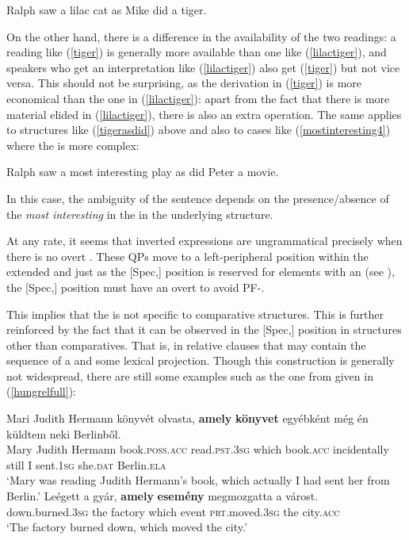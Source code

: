 \ea	Ralph saw a lilac cat as Mike did a tiger. \label{tigerasdid}
\z

On the other hand, there is a difference in the availability of the two readings: a reading like (\ref{tiger}) is generally more available than one like (\ref{lilactiger}), and speakers who get an interpretation like (\ref{lilactiger}) also get (\ref{tiger}) but not vice versa. This should not be surprising, as the derivation in (\ref{tiger}) is more economical than the one in (\ref{lilactiger}): apart from the fact that there is more material elided in (\ref{lilactiger}), there is also an extra  operation. The same applies to structures like (\ref{tigerasdid}) above and also to cases like (\ref{mostinteresting4}) where the  is more complex:

\ea	Ralph saw a most interesting play as did Peter a movie. \label{mostinteresting4}
\z

In this case, the ambiguity of the sentence depends on the presence/absence of the  \textit{most interesting} in the  in the underlying structure.

At any rate, it seems that inverted  expressions are ungrammatical precisely when there is no overt . These QPs move to a left-peripheral position within the extended  and just as the [Spec,] position is reserved for elements with an  (see ), the [Spec,] position must have an overt  to avoid PF-.

This implies that the  is not specific to comparative structures. This is further reinforced by the fact that it can be observed in the [Spec,] position in structures other than comparatives. That is, in relative clauses that may contain the sequence of a  and some lexical projection. Though this construction is generally not widespread, there are still some examples such as the one from  given in (\ref{hungrelfull}):

\ea \label{hungrelfull}
\ea \gll Mari	Judith Hermann	könyvét olvasta, \textbf{amely} \textbf{könyvet} egyébként még én	küldtem	neki	Berlinből. \label{hungrelwhichbook}\\
Mary Judith	Hermann	book.\textsc{poss.acc} read.\textsc{pst.3sg} which	book.\textsc{acc} incidentally still I sent.\textsc{1sg} she.\textsc{dat} Berlin.\textsc{ela}\\
\glt `Mary was reading Judith Hermann's book, which actually I had sent her from Berlin.'
\ex \gll Leégett	a	gyár,	\textbf{amely} \textbf{esemény} megmozgatta	a	várost. \label{hungrelwhichevent}\\
down.burned.\textsc{3sg} the factory which event \textsc{prt}.moved.\textsc{3sg} the city.\textsc{acc}\\
\glt `The factory burned down, which moved the city.'
\z
\z

